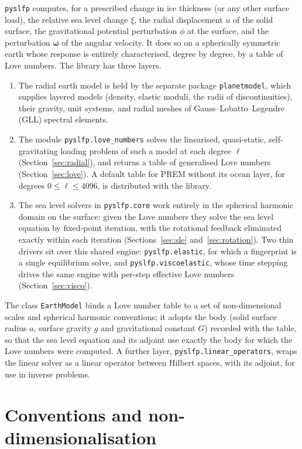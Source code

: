 \documentclass[11pt,a4paper]{article}
\newcommand{\code}[1]{\texttt{#1}}
\numberwithin{equation}{section}
\begin{document}
\texttt{pyslfp} computes, for a prescribed change in ice thickness (or any
other surface load), the relative sea level change $\xi$, the radial
displacement $u$ of the solid surface, the gravitational potential perturbation
$\phi$ at the surface, and the perturbation $\bm{\omega}$ of the angular velocity.
It does so on a spherically symmetric earth whose response is entirely
characterised, degree by degree, by a table of Love numbers. The library has
three layers.
\begin{enumerate}
\item The radial earth model is held by the separate package
\texttt{planetmodel}, which supplies layered models (density, elastic moduli,
the radii of discontinuities), their gravity, unit systems, and radial meshes
of Gauss--Lobatto--Legendre (GLL) spectral elements.
\item The module \texttt{pyslfp.love\_numbers} solves the linearised,
quasi-static, self-gravitating loading problem of such a model at each degree
$\ell$ (Section~\ref{sec:radial}), and returns a table of generalised Love
numbers (Section~\ref{sec:love}). A default table for PREM without its ocean
layer, for degrees $0\le\ell\le 4096$, is distributed with the library.
\item The sea level solvers in \texttt{pyslfp.core} work entirely in the
spherical harmonic domain on the surface: given the Love numbers they solve
the sea level equation by fixed-point iteration, with the rotational feedback
eliminated exactly within each iteration (Sections~\ref{sec:sle}
and~\ref{sec:rotation}). Two thin drivers sit over this shared engine:
\texttt{pyslfp.elastic}, for which a fingerprint is a single equilibrium
solve, and \texttt{pyslfp.viscoelastic}, whose time stepping drives the same
engine with per-step effective Love numbers (Section~\ref{sec:visco}).
\end{enumerate}
The class \code{EarthModel} binds a Love number table to a set of
non-dimensional scales and spherical harmonic conventions; it adopts the body
(solid surface radius $a$, surface gravity $g$ and gravitational constant $G$)
recorded with the table, so that the sea level equation and its adjoint use
exactly the body for which the Love numbers were computed. A further layer,
\texttt{pyslfp.linear\_operators}, wraps the linear solver as a linear
operator between Hilbert spaces, with its adjoint, for use in inverse problems.

\section{Conventions and non-dimensionalisation}
\label{sec:conventions}
\end{document}
